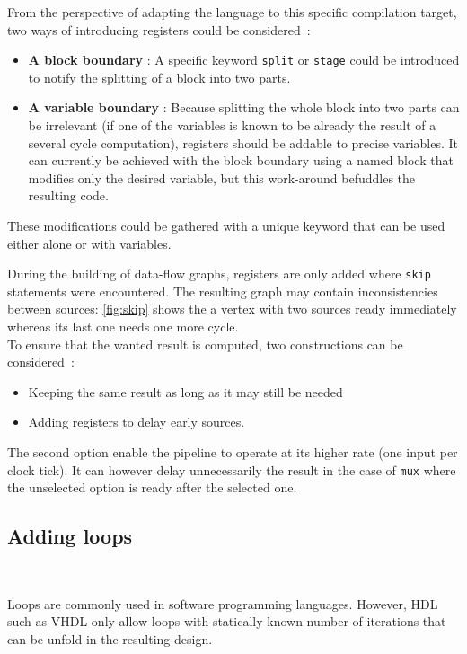 \documentclass[10pt,a4paper]{article}
\newcommand{\code}{\texttt}
\renewcommand{\indent}{~\\\vspace{-.8cm}}
\newcommand{\whileyLine}{\lstinline[language=Whiley,basicstyle=\normalsize\ttfamily]}
\begin{document}
From the perspective of adapting the language to this specific compilation target, two ways of introducing registers could be considered~:

\begin{itemize}
	\item \textbf{A block boundary} : A specific keyword \code{split} or \code{stage} could be introduced to notify the splitting of a block into two parts.
	\item \textbf{A variable boundary} : Because splitting the whole block into two parts can be irrelevant (if one of the variables is known to be already the result of a several cycle computation), registers should be addable to precise variables. It can currently be achieved with the block boundary using a named block that modifies only the desired variable, but this work-around befuddles the resulting code.
\end{itemize}

These modifications could be gathered with a unique keyword that can be used either alone or with variables.


During the building of data-flow graphs, registers are only added where \whileyLine{skip} statements were encountered. The resulting graph may contain inconsistencies between sources: \autoref{fig:skip} shows the a vertex with two sources ready immediately whereas its last one needs one more cycle.\\

To ensure that the wanted result is computed, two constructions can be considered~:

\begin{itemize}
\item Keeping the same result as long as it may still be needed
\item Adding registers to delay early sources. 
\end{itemize}

The second option enable the pipeline to operate at its higher rate (one input per clock tick). It can however delay unnecessarily the result in the case of \code{mux} where the unselected option is ready after the selected one.


\subsection{Adding loops}
\indent

Loops are commonly used in software programming languages. However, HDL such as VHDL only allow loops with statically known number of iterations that can be unfold in the resulting design.
\end{document}
